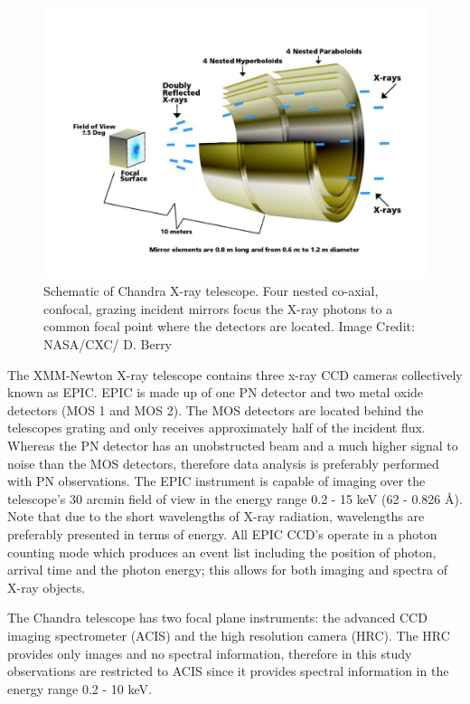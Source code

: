 \begin{figure}
    \centering
    \includegraphics[scale=0.45]{Figures/3-Xray_age/chandra_scheme.pdf}
    \caption{Schematic of Chandra X-ray telescope. Four nested co-axial, confocal, grazing incident mirrors focus the X-ray photons to a common focal point where the detectors are located. Image Credit: NASA/CXC/ D. Berry}
    \label{fig:diagram_xray_telescope}
\end{figure}

The XMM-Newton X-ray telescope \citep{Jansen_etal_2001} contains three x-ray CCD cameras collectively known as EPIC. EPIC is made up of one PN detector and two metal oxide detectors (MOS 1 and MOS 2). The MOS detectors are located behind the telescopes grating and only receives approximately half of the incident flux. Whereas the PN detector has an unobstructed beam and a much higher signal to noise than the MOS detectors, therefore data analysis is preferably performed with PN observations. The EPIC instrument is capable of imaging over the telescope's 30 arcmin field of view in the energy range 0.2 - 15 keV (62 - 0.826 \AA). Note that due to the short wavelengths of X-ray radiation, wavelengths are preferably presented in terms of energy. All EPIC CCD's operate in a photon counting mode which produces an event list including the position of photon, arrival time and the photon energy; this allows for both imaging and spectra of X-ray objects.

The Chandra telescope \citep{Weisskopf_etal_2000} has two focal plane instruments: the advanced CCD imaging spectrometer (ACIS) and the high resolution camera (HRC). The HRC provides only images and no spectral information, therefore in this study observations are restricted to ACIS since it provides spectral information in the energy range 0.2 - 10 keV.

